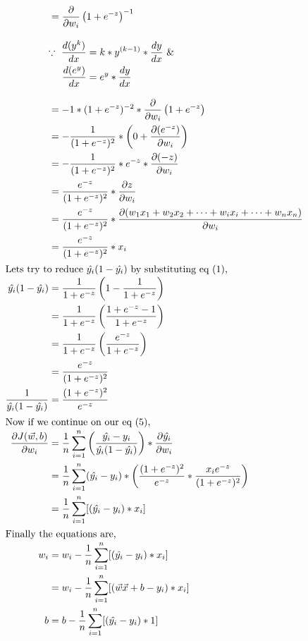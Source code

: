 \documentclass[11pt]{article}
\begin{document}
\begin{align}
    & = \frac{\partial}{\partial{w_i}} \left( 1+e^{-z} \right)^{-1} \notag\\[3mm]
    & \begin{aligned}
        \because\ \frac{d(y^k)}{dx} &= k * y^{(k-1)} * \frac{dy}{dx} \text{ \&} \\
        \frac{d(e^y)}{dx} &= e^y * \frac{dy}{dx}
    \end{aligned} \\[3mm]
    & = -1 * (1+e^{-z})^{-2} * \frac{\partial}{\partial{w_i}} \left( 1+e^{-z} \right) \notag\\
    & = -\frac{1}{(1+e^{-z})^2} * \left( 0+\frac{\partial{(e^{-z})}}{\partial{w_i}} \right) \notag\\
    & = -\frac{1}{(1+e^{-z})^2} * e^{-z} * \frac{\partial{(-z)}}{\partial{w_i}} \notag\\
    & = \frac{e^{-z}}{(1+e^{-z})^2} * \frac{\partial{z}}{\partial{w_i}} \notag\\
    & = \frac{e^{-z}}{(1+e^{-z})^2} * \frac{\partial{(w_1 x_1 + w_2 x_2 +\dots+ w_i x_i +\dots+ w_n x_n)}}{\partial{w_i}} \notag\\
    & = \frac{e^{-z}}{(1+e^{-z})^2} * x_i \notag\\
    \intertext{Lets try to reduce $\hat{y_i}(1 - \hat{y_i})$ by substituting eq (1),}\notag\\[-7mm]
    \hat{y_i}(1 - \hat{y_i}) & = \frac{1}{1+e^{-z}}\left(1 - \frac{1}{1+e^{-z}}\right) \notag\\
    & = \frac{1}{1+e^{-z}}\left(\frac{1 + e^{-z} - 1}{1+e^{-z}}\right) \notag\\
    & = \frac{1}{1+e^{-z}}\left(\frac{e^{-z}}{1+e^{-z}}\right) \notag\\
    & = \frac{e^{-z}}{(1+e^{-z})^2} \notag\\
    \frac{1}{\hat{y_i}(1 - \hat{y_i})} & = \frac{(1+e^{-z})^2}{e^{-z}} \notag\\
    \intertext{Now if we continue on our eq (5),}\notag\\[-7mm]
    \frac{\partial{J(\vec{w}, b)}}{\partial{w_i}} & = \frac{1}{n} \displaystyle\sum_{i=1}^{n} \left( \frac{\hat{y_i} - y_i}{\hat{y_i}(1 - \hat{y_i})} \right) * \frac{\partial{\hat{y_i}}}{\partial{w_i}} \notag\\
    & = \frac{1}{n} \displaystyle\sum_{i=1}^{n} (\hat{y_i} - y_i) * \left( \frac{(1+e^{-z})^2}{e^{-z}} * \frac{x_i e^{-z}}{(1+e^{-z})^2} \right) \notag\\
    & = \frac{1}{n} \displaystyle\sum_{i=1}^{n} [(\hat{y_i} - y_i) * x_i ] \notag\\
    \intertext{Finally the equations are,}\notag\\[-7mm]
    w_i & = w_i - \frac{1}{n} \displaystyle\sum_{i=1}^{n} [(\hat{y_i} - y_i) * x_i ] \\
    & = w_i - \frac{1}{n} \displaystyle\sum_{i=1}^{n} [(\vec{w}\vec{x}+b - y_i) * x_i ] \notag\\
    b & = b - \frac{1}{n} \displaystyle\sum_{i=1}^{n} [(\hat{y_i} - y_i) * 1 ] \notag &&
\end{align}
\end{document}
